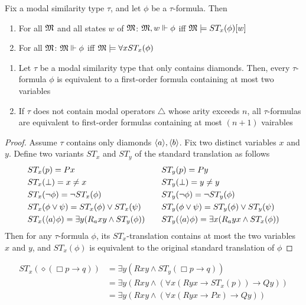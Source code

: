 \documentclass[11pt]{article}
\begin{document}
\begin{proposition}
\label{prop2.47}
Fix a modal similarity type \(\tau\), and let \(\phi\) be a \(\tau\)-formula. Then
\begin{enumerate}
\item For all \(\mathfrak{M}\) and all states \(w\) of \(\mathfrak{M}\): \(\mathfrak{M},w\Vdash \phi\) iff
\(\mathfrak{M}\models ST_x(\phi)[w]\)
\item For all \(\mathfrak{M}\): \(\mathfrak{M}\Vdash\phi\) iff \(\mathfrak{M}\models\forall x ST_x(\phi)\)
\end{enumerate}
\end{proposition}

\begin{proposition}[]
\begin{enumerate}
\item Let \(\tau\) be a modal similarity type that only contains diamonds. Then, every
\(\tau\)-formula \(\phi\) is equivalent to a first-order formula containing at
most two variables
\item If \(\tau\) does not contain modal operators \(\triangle\) whose arity exceeds
\(n\), all \(\tau\)-formulas are equivalent to first-order formulas
containing at most \((n+1)\) vairables
\end{enumerate}
\end{proposition}

\begin{proof}
Assume \(\tau\) contains only diamonds \(\langle a\rangle,\langle b\rangle\). Fix two distinct
variables \(x\) and \(y\). Define two variants \(ST_x\) and \(ST_y\) of the
standard translation as follows
\begin{alignat*}{2}
&ST_x(p)=Px&&ST_y(p)=Py\\
&ST_x(\bot)=x\neq x\quad&&ST_y(\bot)=y\neq y\\
&ST_x(\neg\phi)=\neg ST_x(\phi)&&ST_y(\neg\phi)=\neg ST_y(\phi)\\
&ST_x(\phi\vee\psi)=ST_x(\phi)\vee ST_x(\psi)&&ST_y(\phi\vee\psi)=ST_y(\phi)\vee ST_y(\psi)\\
&ST_x(\langle a\rangle\phi)=\exists y(R_axy\wedge ST_y(\phi))\quad&&
ST_y(\langle a\rangle\phi)=\exists x(R_ayx\wedge ST_x(\phi))
\end{alignat*}
Then for any \(\tau\)-formula \(\phi\), its \(ST_x\)-translation contains at most
the two variables \(x\) and \(y\), and \(ST_x(\phi)\) is equivalent to the
original standard translation of \(\phi\)
\end{proof}

\begin{examplle}[]
\begin{align*}
ST_x(\diamond(\Box p\to q))&=
\exists y(Rxy\wedge ST_y(\Box p\to q))\\
&=\exists y(Rxy\wedge(\forall x(Ryx\to ST_x(p))\to Qy))\\
&=\exists y(Rxy\wedge(\forall x(Ryx\to Px)\to Qy))
\end{align*}
\end{examplle}
\end{document}
